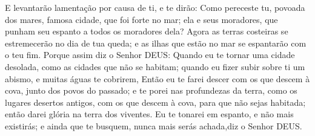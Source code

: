 {  E levantarão lamentação por causa de ti, e te dirão: Como pereceste tu, povoada dos mares, famosa cidade, que foi forte no mar; ela e seus moradores, que punham seu espanto a todos os moradores dela?
  Agora as terras costeiras se estremecerão no dia de tua queda; e as ilhas que estão no mar se espantarão com o teu fim.
  Porque assim diz o Senhor DEUS: Quando eu te tornar uma cidade desolada, como as cidades que não se habitam; quando eu fizer subir sobre ti um abismo, e muitas águas te cobrirem,
  Então eu te farei descer com os que descem à cova, junto dos povos do passado; e te porei nas profundezas da terra, como os lugares desertos antigos, com os que descem à cova, para que não sejas habitada; então darei glória
 na terra dos viventes.
  Eu te tonarei em espanto, e não mais existirás; e ainda que te busquem, nunca mais serás achada,diz o Senhor DEUS.
\par }

